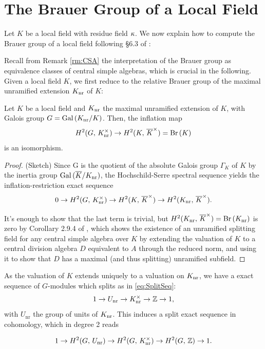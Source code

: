 \documentclass[a4paper, oneside]{memoir}
\begin{document}
\section{The Brauer Group of a Local Field}

Let $K$ be a local field with residue field $\kappa$. We now explain how to compute the Brauer group of a local field following \S 6.3 of \cite{SzamuelyGille}:

Recall from Remark \ref{rm:CSA} the interpretation of the Brauer group as equivalence classes of central simple algebras, which is crucial in the following. Given a local field $K$, we first reduce to the relative Brauer group of the maximal unramified extension $K_{\text{nr}}$ of $K$:

\begin{proposition}
	Let $K$ be a local field and $K_{\text{nr}}$ the maximal unramified extension of $K$, with Galois group $G=\operatorname{Gal}{(K_{\text{nr}}/K)}$. Then, the inflation map
	\[
		H^{2}( G, \, K_{\text{nr}}^\times )\to H^{2}( K, \, \overline{K}^\times )= \operatorname{Br}{(K)}
	\]
	is an isomorphism.

\end{proposition}
\begin{proof}{(Sketch)}
	Since G is the quotient of the absolute Galois group $\Gamma_K$ of $K$ by the inertia group $\operatorname{Gal}{(\overline{K}/K_{\text{nr}})}$, the Hochschild-Serre spectral sequence yields the inflation-restriction exact sequence
	\[
		0\to H^{2}( G, \, K_{\text{nr}}^\times )\to H^{2}( K, \, \overline{K}^\times )\to H^{2}( K_{\text{nr}}, \, \overline{K}^\times ).
	\]

	It's enough to show that the last term is trivial, but $H^{2}( K_{\text{nr}}, \, \overline{K}^\times )=\operatorname{Br}{(K_{\text{nr}})}$ is zero by Corollary 2.9.4 of \cite{SzamuelyGille}, which shows the existence of an unramified splitting field for any central simple algebra over $K$ by extending the valuation of $K$ to a central division algebra $D$ equivalent to $A$ through the reduced norm, and using it to show that $D$ has a maximal (and thus splitting) unramified subfield.
\end{proof}
As the valuation of $K$ extends uniquely to a valuation on $K_{\text{nr}}$, we have a exact sequence of $G$-modules which splits as in \eqref{eq:SplitSeq}:
\[
	1\to U_{\text{nr}} \to K_{\text{nr}}^\times\to\mathbb{Z}\to 1,
\]
with $U_{\text{nr}}$ the group of units of $K_{\text{nr}}$. This induces a split exact sequence in cohomology, which in degree 2 reads

\begin{equation}\label{eq:BrSeq}
	1\to H^{2}( G, \, U_{\text{nr}} )\to H^{2}( G, \, K_{\text{nr}}^\times )\to H^{2}( G, \, \mathbb{Z} )\to 1.
\end{equation}
\end{document}
